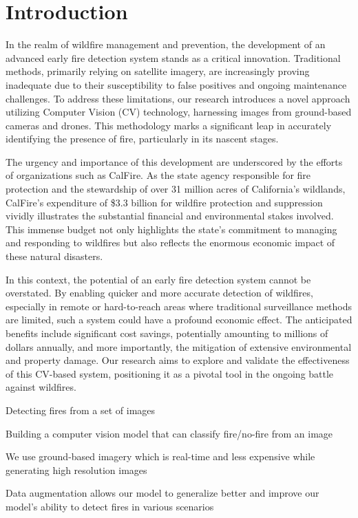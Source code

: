 \section{Introduction}

In the realm of wildfire management and prevention, the development of an advanced early fire detection system stands as a critical innovation. Traditional methods, primarily relying on satellite imagery, are increasingly proving inadequate due to their susceptibility to false positives and ongoing maintenance challenges. To address these limitations, our research introduces a novel approach utilizing Computer Vision (CV) technology, harnessing images from ground-based cameras and drones. This methodology marks a significant leap in accurately identifying the presence of fire, particularly in its nascent stages.

The urgency and importance of this development are underscored by the efforts of organizations such as CalFire. As the state agency responsible for fire protection and the stewardship of over 31 million acres of California's wildlands, CalFire's expenditure of \$3.3 billion for wildfire protection and suppression vividly illustrates the substantial financial and environmental stakes involved. ~\citep{calfire} This immense budget not only highlights the state's commitment to managing and responding to wildfires but also reflects the enormous economic impact of these natural disasters.

In this context, the potential of an early fire detection system cannot be overstated. By enabling quicker and more accurate detection of wildfires, especially in remote or hard-to-reach areas where traditional surveillance methods are limited, such a system could have a profound economic effect. The anticipated benefits include significant cost savings, potentially amounting to millions of dollars annually, and more importantly, the mitigation of extensive environmental and property damage. Our research aims to explore and validate the effectiveness of this CV-based system, positioning it as a pivotal tool in the ongoing battle against wildfires.


Detecting fires from a set of images

Building a computer vision model that can classify fire/no-fire from an image

We use ground-based imagery which is real-time and less expensive while generating high resolution images

Data augmentation allows our model to generalize better and improve our model’s ability to detect fires in various scenarios

